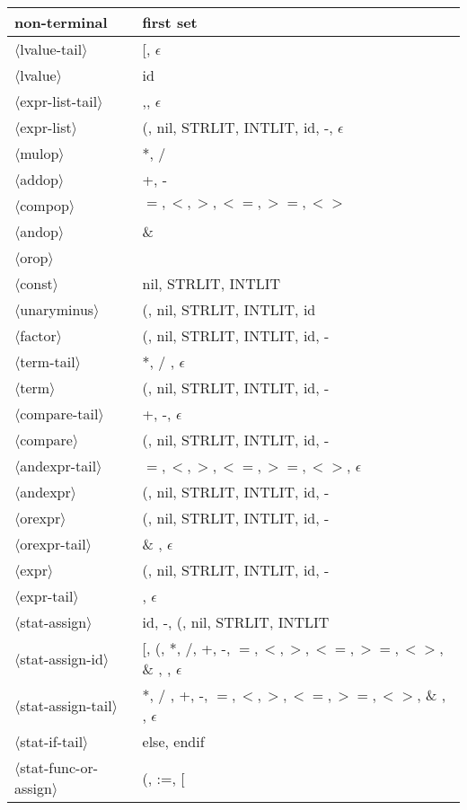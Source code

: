 \documentclass[11pt, fleqn]{article}
\newcommand{\atag}[1]{$\langle$#1$\rangle$}
\begin{document}
\begin{longtable}{l|l}
non-terminal						&	first set												\\
\hline
\atag{lvalue-tail}				&	[, $\epsilon$												\\
\atag{lvalue}					&	id														\\
\atag{expr-list-tail}			&	,, $\epsilon$												\\
\atag{expr-list}					&	(, nil, STRLIT, INTLIT, id, -, $\epsilon$				\\
\atag{mulop}						&	*, /														\\
\atag{addop}						&	+, -														\\
\atag{compop}					&	$=, <, >, <=, >=, <>$									\\
\atag{andop}						&	\&														\\
\atag{orop} 						&	\textbar		\\
\atag{const}						&	nil, STRLIT, INTLIT		\\
\atag{unaryminus}				&	(, nil, STRLIT, INTLIT, id		\\
\atag{factor}					&	(, nil, STRLIT, INTLIT, id, -		\\
\atag{term-tail}					&	*, /	, $\epsilon$	\\
\atag{term} 						&	(, nil, STRLIT, INTLIT, id, -		\\
\atag{compare-tail}				&	+, -, $\epsilon$	\\
\atag{compare} 					&	(, nil, STRLIT, INTLIT, id, -		\\
\atag{andexpr-tail}				&	$=, <, >, <=, >=, <>$, $\epsilon$	\\
\atag{andexpr} 					&	(, nil, STRLIT, INTLIT, id, -		\\
\atag{orexpr} 					&	(, nil, STRLIT, INTLIT, id, -		\\
\atag{orexpr-tail}				&	\& , $\epsilon$	\\
\atag{expr}						&	(, nil, STRLIT, INTLIT, id, -		\\
\atag{expr-tail}					&	\textbar	, $\epsilon$	\\
\atag{stat-assign}				&	id, -, (, nil, STRLIT, INTLIT	\\
\atag{stat-assign-id}			&	[, (, *, /, +, -, $=, <, >, <=, >=, <>$, \& , \textbar , $\epsilon	$\\
\atag{stat-assign-tail}			&	*, /	, +, -, $=, <, >, <=, >=, <>$, \& , \textbar , $\epsilon$	\\
\atag{stat-if-tail}				&	else, endif		\\
\atag{stat-func-or-assign}		&	(, :=, [		\\

\end{longtable}
\end{document}
